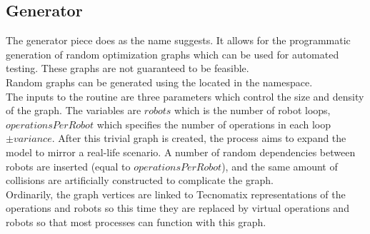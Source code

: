 \subsection{Generator}

The generator piece does as the name suggests. It allows for the programmatic generation of random optimization graphs which can be used for automated testing. These graphs are not guaranteed to be feasible. \\

Random graphs can be generated using the  located in the  namespace. \\

The inputs to the routine are three parameters which control the size and density of the graph. The variables are $robots$ which is the number of robot loops, $operationsPerRobot$ which specifies the number of operations in each loop $\pm variance$. After this trivial graph is created, the process aims to expand the model to mirror a real-life scenario. A number of random dependencies between robots are inserted (equal to $operationsPerRobot$), and the same amount of collisions are artificially constructed to complicate the graph. \\

Ordinarily, the graph vertices are linked to Tecnomatix representations of the operations and robots so this time they are replaced by virtual operations and robots so that most processes can function with this graph. \\